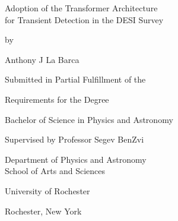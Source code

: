 \begin{titlepage}
  \vspace*{\fill}

  \begin{center}
    {\Huge Adoption of the Transformer Architecture \\for Transient Detection in the DESI Survey\par
    }

    \bigskip%
    by

    \bigskip%
    Anthony J La Barca


    \bigskip\bigskip\bigskip\bigskip%
    Submitted in Partial Fulfillment of the

    \bigskip%
    Requirements for the Degree

    \bigskip%
    Bachelor of Science in Physics and Astronomy


    \bigskip\bigskip\bigskip\bigskip%
    Supervised by Professor Segev BenZvi

    \bigskip\bigskip%
    Department of Physics and Astronomy\\
    School of Arts and Sciences


    \bigskip\bigskip\bigskip\bigskip%
    University of Rochester

    \bigskip%
    Rochester, New York


    \bigskip\bigskip\bigskip{}
  \end{center}

  \vspace*{\fill}
\end{titlepage}

